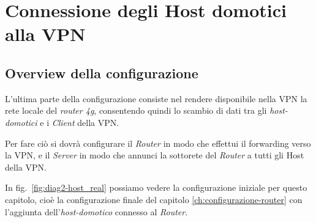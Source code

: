 
\chapter{Connessione degli Host domotici alla VPN}
\label{ch:connessione-host-domotici}

\section{Overview della configurazione \ok}

L'ultima parte della configurazione consiste nel rendere disponibile nella VPN la rete locale del \textit{router 4g}, consentendo quindi lo scambio di dati tra gli \textit{host-domotici} e i \textit{Client} della VPN.

Per fare ciò si dovrà configurare il \textit{Router} in modo che effettui il forwarding verso la VPN, e il \textit{Server} in modo che annunci la sottorete del \textit{Router} a tutti gli Host della VPN.

In fig.~\ref{fig:diag2-host_real} possiamo vedere la configurazione iniziale per questo capitolo, cioè la configurazione finale del capitolo \ref{ch:configurazione-router} con l'aggiunta dell'\textit{host-domotico} connesso al \textit{Router}. 



